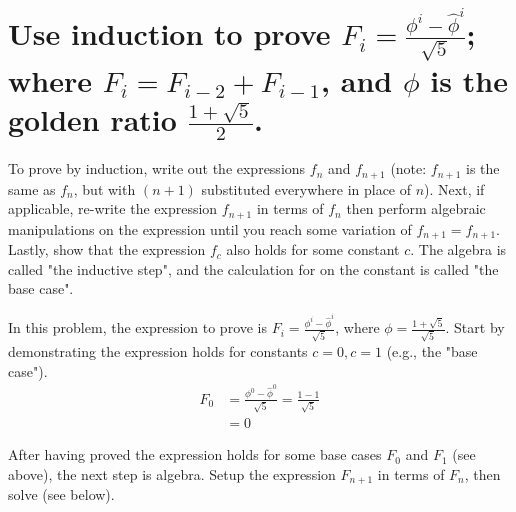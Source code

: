 \section[Problem 2]{Use induction to prove $F_i = \frac{\phi^i - \hat{\phi}^i}{\sqrt{5}}$; where $F_i = F_{i-2} + F_{i-1}$, and $\phi$ is the golden ratio $\frac{1 + \sqrt{5}}{2}$.}

To prove by induction, write out the expressions $f_n$ and $f_{n + 1}$ (note: $f_{n + 1}$ is the same as $f_n$, but with $(n + 1)$ substituted everywhere in place of $n$). Next, if applicable, re-write the expression $f_{n + 1}$ in terms of $f_n$ then perform algebraic manipulations on the expression until you reach some variation of $f_{n + 1} = f_{n + 1}$.  Lastly, show that the expression $f_c$ also holds for some constant $c$. The algebra is called "the inductive step", and the calculation for on the constant is called "the base case".

In this problem, the expression to prove is $F_i = \frac{\phi^i - \hat{\phi}^i}{\sqrt{5}}$, where $\phi = \frac{1 + \sqrt{5}}{\sqrt{5}}$. Start by demonstrating the expression holds for constants $c = 0, c = 1$ (e.g., the "base case"). 
\begin{align}
	F_0 &= \frac{\phi^0 - \hat{\phi}^0}{\sqrt{5}} = \frac{1 - 1}{\sqrt{5}} \\[16pt]
		&= 0 
\end{align}

After having proved the expression holds for some base cases $F_0$ and $F_1$ (see above), the next step is algebra. Setup the expression $F_{n + 1}$ in terms of $F_n$, then solve (see below).

